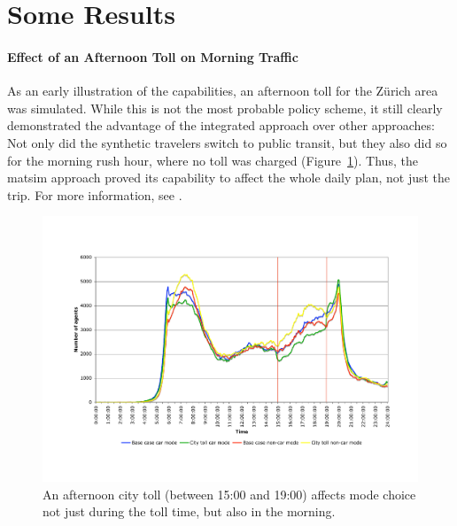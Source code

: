 \section{Some Results}

\paragraph{Effect of an Afternoon Toll on Morning Traffic}

As an early illustration of the capabilities, an afternoon toll for the Zürich area was simulated.  While this is not the most probable policy scheme, it still clearly demonstrated the advantage of the integrated approach over other approaches: Not only did the synthetic travelers switch to public transit, but they also did so for the morning rush hour, where no toll was charged (Figure~\ref{fig:afternoon-toll}).  Thus, the \acrshort{matsim} approach proved its capability to affect the whole daily plan, not just the trip.  For more information, see \cite{RieserEtAl_TRBTDF_2008}.

\begin{figure}[!h!t]
\centerline{%
\includegraphics[width=0.99\hsize,trim=2cm 2.5cm 2cm 3cm,clip]{extending/figures/roadpricing/583vs585onRoute.pdf}
}
\caption{An afternoon city toll (between 15:00 and 19:00) affects mode choice not just during the toll time, but also in the morning.}
\label{fig:afternoon-toll}
\end{figure}


